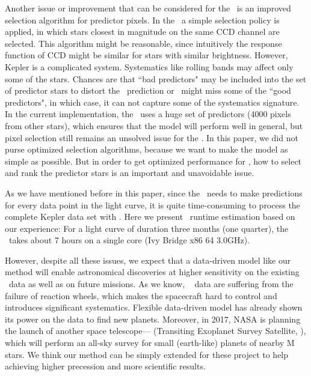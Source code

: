 Another issue or improvement that can be considered for the \name\ is an improved selection algorithm for predictor pixels. 
In the \name\, a simple selection policy is applied, in which stars closest in magnitude on the same CCD channel are selected. This algorithm might be reasonable, since intuitively the response function of CCD might be similar for stars with similar brightness. 
However, Kepler is a complicated system. Systematics like rolling bands \citep{handbook} may affect only some of the stars. Chances are that ``bad predictors" may be included into the set of predictor stars to distort the \name\ prediction or \name\ might miss some of the ``good predictors", in which case, it can not capture some of the systematics signature. In the current implementation, the \name\ uses a huge set of predictors (4000 pixels from other stars), which ensures that the model will perform well in general, but pixel selection still remains an unsolved issue for the \name.
In this paper, we did not purse optimized selection algorithms, because we want to make the model as simple as possible. But in order to get optimized performance for \name, how to select and rank the predictor stars is an important and unavoidable issue.

As we have mentioned before in this paper,  since the \name\ needs to make predictions for every data point in the light curve, it is quite time-consuming to process the complete Kepler data set with \name. Here we present \name\ runtime estimation based on our experience: For a light curve of duration three months (one quarter), the \name\ takes about 7 hours on a single core (Ivy Bridge x86 64 3.0GHz).

However, despite all these issues, we expect that a data-driven model like our method will enable astronomical discoveries at higher sensitivity on the existing \Kepler\ data as well as on future missions.  
As we know, \Kepler\  \citep{k2} data are suffering from the failure of reaction wheels,  which makes the spacecraft hard to control and introduces significant systematics. 
Flexible data-driven model \citep{dfm} has already shown its power on the  data to find new planets.
Moreover, in 2017, NASA is planning the launch of another space telescope--- (Transiting Exoplanet Survey Satellite, \citealt{tess}), 
  which will perform an all-sky survey for small (earth-like) planets of nearby M stars. 
  We think our method can be simply extended for these project to help achieving higher precession and more scientific results. 


